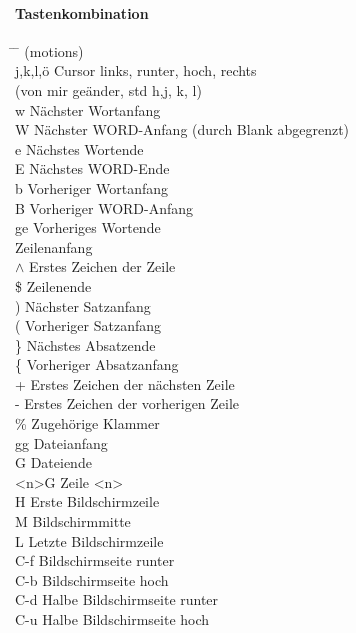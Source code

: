 \documentclass[10pt,a4paper,twoside]{book}
\begin{document}
\paragraph{Tastenkombination}
\begin{tabbing}
\hspace*{1mm} \=\hspace*{30mm} \= \kill
(motions)\\
\> j,k,l,ö	\>	Cursor links, runter, hoch, rechts\\
(von mir geänder, std h,j, k, l)\\
\> w	 \>	Nächster Wortanfang\\
\> W	 \>	Nächster WORD-Anfang (durch Blank abgegrenzt)\\
\> e	 \>	Nächstes Wortende\\
\> E	 \>	Nächstes WORD-Ende\\
\> b	 \>	Vorheriger Wortanfang\\
\> B	 \>	Vorheriger WORD-Anfang\\
\> ge \>		Vorheriges Wortende\\
	 \>	Zeilenanfang\\
\>  \begin{math} \wedge \end{math} \>		Erstes Zeichen der Zeile\\
\> \$ \>		Zeilenende\\
\> )	 \>	Nächster Satzanfang\\
\> (	 \>	Vorheriger Satzanfang\\
\> \}	 \>	Nächstes Absatzende\\
\> \{	 \>	Vorheriger Absatzanfang\\
\> +	 \>	Erstes Zeichen der nächsten Zeile\\
\> -	 \>	Erstes Zeichen der vorherigen Zeile\\
\> \% \>		Zugehörige Klammer\\
\> gg \>		Dateianfang\\
\> G	 \>	Dateiende\\
\> <n>G \>		Zeile <n>\\
\> H	 \>	Erste Bildschirmzeile\\
\> M	 \>	Bildschirmmitte\\
\> L	 \>	Letzte Bildschirmzeile\\
\> C-f	\>	Bildschirmseite runter\\
\> C-b	\>	Bildschirmseite hoch\\
\> C-d	\>	Halbe Bildschirmseite runter\\
\> C-u	\>	Halbe Bildschirmseite hoch\\

\end{tabbing}
\end{document}
